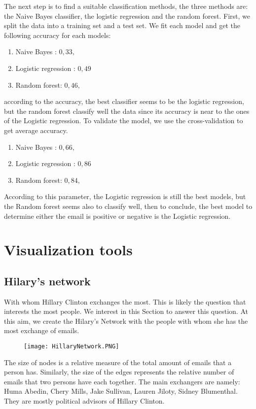 \documentclass[11pt]{article}
\begin{document}
The next step is to find a suitable classification methods, the three methods are: the Naive Bayes classifier, the logistic regression and the random forest. First, we split the data into a training set and a test set. We fit each model and get the following accuracy for each models:
\begin{enumerate}
    \item Naive Bayes : $0,33,$
    \item Logistic regression : $0,49$ 
    \item Random forest: $0,46,$
\end{enumerate}
according to the accuracy, the best classifier seems to be the logistic regression, but the random forest classify well the data since its accuracy is near to the ones of the Logistic regression. To validate the model, we use the cross-validation to get average accuracy.
\begin{enumerate}
    \item Naive Bayes : $0,66,$
    \item Logistic regression : $0,86$ 
    \item Random forest: $0,84,$
\end{enumerate}
According to this parameter, the Logistic regression is still the best models, but the Random forest seems also to classify well, then to conclude, the best model to determine either the email is positive or negative is the Logistic regression.
\section{Visualization tools}

\subsection{Hilary's network}
With whom Hillary Clinton exchanges the most. This is likely the question that interests the most people. We interest in this Section to answer this question. At this aim, we create the Hilary's Network with the people with whom she has the most exchange of emails.
\begin{figure}[h]
	\centering
	\texttt{[image: HillaryNetwork.PNG]}
\end{figure}
The size of nodes is a relative measure of the total amount of emails that a person has. Similarly, the size of the edges represents the relative number of emails that two persons have each together. The main exchangers are namely: Huma Abedin, Chery Mills, Jake Sullivan, Lauren Jiloty, Sidney Blumenthal. They are mostly political advisors of Hillary Clinton.
\end{document}
